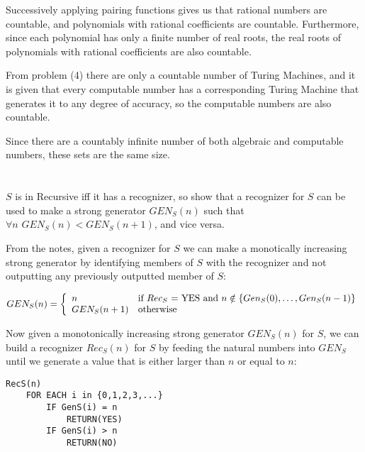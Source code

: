 \documentclass{article}
\begin{document}
\vspace{1em}

Successively applying pairing functions gives us that rational numbers are
countable, and polynomials with rational coefficients are countable.
Furthermore, since each polynomial has only a finite number of real roots, the
real roots of polynomials with rational coefficients are also countable.

\vspace{1em}

From problem (4) there are only a countable number of Turing Machines, and it is
given that every computable number has a corresponding Turing Machine that
generates it to any degree of accuracy, so the computable numbers are also
countable.

\vspace{1em}

Since there are a countably infinite number of both algebraic and computable
numbers, these sets are the same size.

\section{}

$S$ is in Recursive iff it has a recognizer, so show that a recognizer for $S$
can be used to make a strong generator $GEN_S(n)$ such that
$\forall n \hspace{4pt} GEN_S(n) < GEN_S(n + 1)$, and vice versa.

\vspace{1em}

From the notes, given a recognizer for $S$ we can make a monotically increasing
strong generator by identifying members of $S$ with the recognizer and not
outputting any previously outputted member of $S$:

\[
GEN_S(n) = \left\{
    \begin{array}{l l}
        n &  \text{if $Rec_S$ = YES and $n \notin \{Gen_S(0),\ldots,Gen_S(n-1)$\}} \\
        GEN_S(n+1) & \text{otherwise} \\
    \end{array} \right.
\]

Now given a monotonically increasing strong generator $GEN_S(n)$ for $S$, we can
build a recognizer $Rec_S(n)$ for $S$ by feeding the natural numbers into 
$GEN_S$ until we generate a value that is either larger than $n$ or equal to
$n$:

\begin{verbatim}
RecS(n)
    FOR EACH i in {0,1,2,3,...}
        IF GenS(i) = n
            RETURN(YES)
        IF GenS(i) > n
            RETURN(NO)
\end{verbatim}
\end{document}
